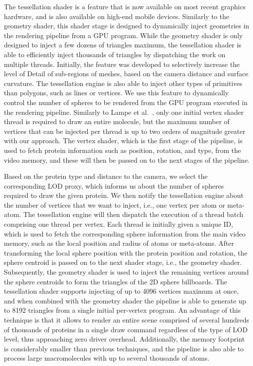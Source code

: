 The tessellation shader is a feature that is now available on most recent graphics hardware, and is also available on high-end mobile devices.
Similarly to the geometry shader, this shader stage is designed to dynamically inject geometries in the rendering pipeline from a GPU program.
While the geometry shader is only designed to inject a few dozens of triangles maximum, the tessellation shader is able to efficiently inject thousands of triangles by dispatching the work on multiple threads.
Initially, the feature was developed to selectively increase the level of Detail of sub-regions of meshes, based on the camera distance and surface curvature.
The tessellation engine is also able to inject other types of primitives than polygons, such as lines or vertices.
We use this feature to dynamically control the number of spheres to be rendered from the GPU program executed in the rendering pipeline.
Similarly to Lampe et al.~\cite{lampe2007two}, only one initial vertex shader thread is required to draw an entire molecule, but the maximum number of vertices that can be injected per thread is up to two orders of magnitude greater with our approach.
The vertex shader, which is the first stage of the pipeline, is used to fetch protein information such as position, rotation, and type, from the video memory, and these will then be passed on to the next stages of the pipeline.

Based on the protein type and distance to the camera, we select the corresponding LOD proxy, which informs us about the number of spheres required to draw the given protein.
We then notify the tessellation engine about the number of vertices that we want to inject, i.e., one vertex per atom or meta-atom.
The tessellation engine will then dispatch the execution of a thread batch comprising one thread per vertex.
Each thread is initially given a unique ID, which is used to fetch the corresponding sphere information from the main video memory, such as the local position and radius of atoms or meta-atoms.
After transforming the local sphere position with the protein position and rotation, the sphere centroid is passed on to the next shader stage, i.e., the geometry shader.
Subsequently, the geometry shader is used to inject the remaining vertices around the sphere centroids to form the triangles of the 2D sphere billboards.
The tessellation shader supports injecting of up to 4096 vertices maximum at once, and when combined with the geometry shader the pipeline is able to generate up to 8192 triangles from a single initial per-vertex program.
An advantage of this technique is that it allows to render an entire scene comprised of several hundreds of thousands of proteins in a single draw command regardless of the type of LOD level, thus approaching zero driver overhead.
Additionally, the memory footprint is considerably smaller than previous techniques, and the pipeline is also able to process large macromolecules with up to several thousands of atoms.

